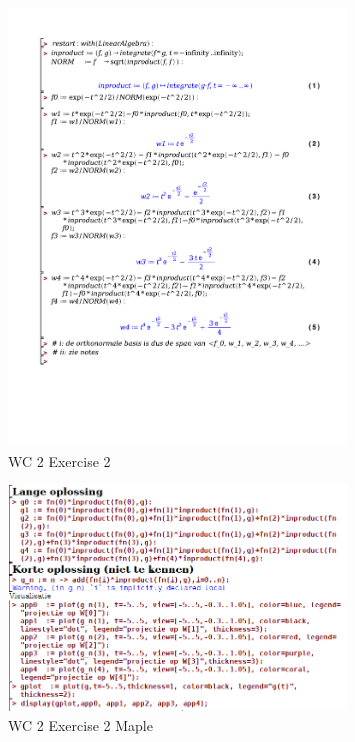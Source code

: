 \documentclass[a4paper]{article}
\begin{document}
\begin{figure}[H]
	\centering
	\includegraphics[width=0.8\textwidth]{exercises/wc_2_ex_2.pdf}
	\caption{WC 2 Exercise 2}
	\label{fig:wc_2_ex_2}
\end{figure}


\begin{figure}[H]
	\centering
	\includegraphics[width=0.8\textwidth]{assets/wc_2_ex_2_maple.png}
	\caption{WC 2 Exercise 2 Maple}
	\label{fig:wc_2_ex_2_maple}
\end{figure}
\end{document}
